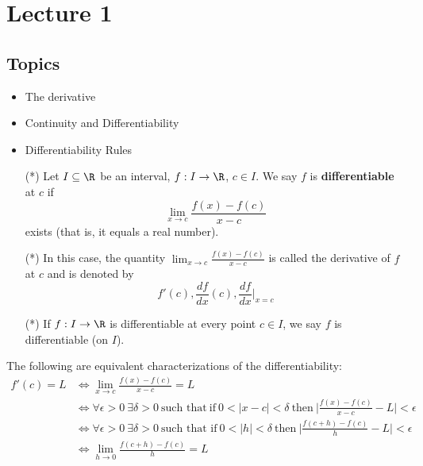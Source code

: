 % 
% 

\section{Lecture 1}

\subsection{Topics}

\begin{itemize}
    \item The derivative
    \item Continuity and Differentiability
    \item Differentiability Rules
\end{itemize}

\begin{definition}[Differentiability]
    \begin{enumerate}
        \item[(*)] Let \( I \subseteq  \R  \) be an interval, \( f: I \to \R  \), \( c \in I  \). We say \( f  \) is \textbf{differentiable} at \( c  \) if 
    \[  \lim_{ x \to c }  \frac{ f(x) -f(c) }{ x - c  } \]
    exists (that is, it equals a real number).
    \item[(*)] In this case, the quantity \( \lim_{ x \to c }  \frac{ f(x) - f(c) }{ x - c  }  \) is called the derivative of \( f  \) at \( c  \) and is denoted by
        \[  f'(c), \frac{ df }{ dx }(c), \frac{ df }{ dx } \Bigg|_{x = c} \]
    \item[(*)] If \( f: I \to \R  \) is differentiable at every point \( c \in I  \), we say \( f \) is differentiable (on \( I  \)).
    \end{enumerate}
\end{definition}

\begin{remark}
    The following are equivalent characterizations of the differentiability:
    \begin{align*}
        f'(c) = L &\iff \lim_{ x \to c }  \frac{ f(x) - f(c) }{ x - c  }  = L  \\
                  &\iff \forall \epsilon > 0 \ \exists \delta > 0 \ \text{such that} \ \text{if} \ 0 < | x - c  | < \delta \ \text{then} \ \Big| \frac{ f(x) - f(c) }{ x - c  }  - L  \Big|  < \epsilon \\
                  &\iff \forall \epsilon > 0 \ \exists \delta > 0 \ \text{such that if} \ 0 < | h  |  < \delta \ \text{then} \ \Big| \frac{ f(c+h) - f(c) }{  h  }  - L  \Big|  < \epsilon \\
                  &\iff \lim_{ h \to 0 }  \frac{ f(c+h) - f(c) }{  h  }  = L 
    \end{align*}
\end{remark}

